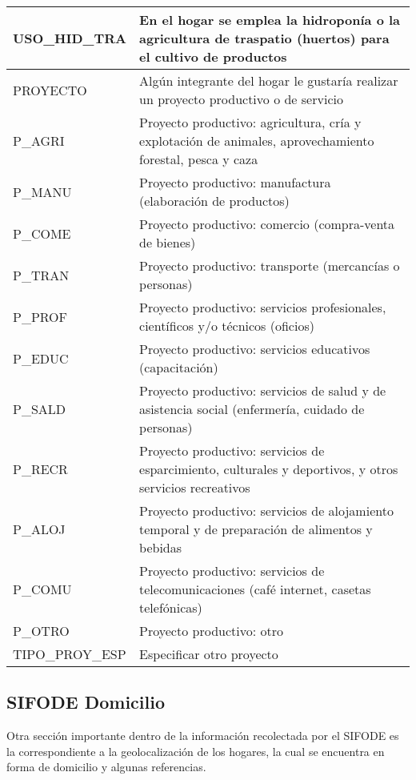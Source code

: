 \begin{longtable}{|p{8cm}|p{8cm}|}
    \hline
    USO\_HID\_TRA & En el hogar se emplea la hidroponía o la agricultura de traspatio (huertos) para el cultivo de productos \\
    \hline
    PROYECTO & Algún integrante del hogar le gustaría realizar un proyecto productivo o de servicio \\
    \hline
    P\_AGRI & Proyecto productivo: agricultura, cría y explotación de animales, aprovechamiento forestal, pesca y caza \\
    \hline
    P\_MANU & Proyecto productivo: manufactura (elaboración de productos) \\
    \hline
    P\_COME & Proyecto productivo: comercio (compra-venta de bienes)\\
    \hline
    P\_TRAN & Proyecto productivo: transporte (mercancías o personas)\\
    \hline
    P\_PROF & Proyecto productivo: servicios profesionales, científicos y/o técnicos (oficios)\\
    \hline
    P\_EDUC & Proyecto productivo: servicios educativos (capacitación) \\
    \hline
    P\_SALD & Proyecto productivo: servicios de salud y de asistencia social (enfermería, cuidado de personas)\\
    \hline
    P\_RECR & Proyecto productivo: servicios de esparcimiento, culturales y deportivos, y otros servicios recreativos\\
    \hline
    P\_ALOJ & Proyecto productivo: servicios de alojamiento temporal y de preparación de alimentos y bebidas\\
    \hline
    P\_COMU & Proyecto productivo: servicios de telecomunicaciones (café internet, casetas telefónicas)\\
    \hline
    P\_OTRO & Proyecto productivo: otro\\
    \hline
    TIPO\_PROY\_ESP &  Especificar otro proyecto \\
    \hline
\end{longtable}
\caption{Catálogo de variables socioeconómicas SIFODE 39.9}
\label{tab:varsocioe}

\subsection{SIFODE Domicilio}
Otra sección importante dentro de la información recolectada por el SIFODE es la correspondiente a la geolocalización de los hogares, la cual se encuentra en forma de domicilio y algunas referencias.

